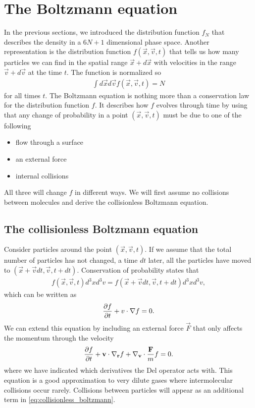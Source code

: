 \section{The Boltzmann equation}
In the previous sections, we introduced the distribution function $f_N$ that describes the density in a $6N+1$ dimensional phase space. Another representation is the distribution function $f(\vec x, \vec v, t)$ that tells us how many particles we can find in the spatial range $\vec x + d\vec x$ with velocities in the range $\vec v + d\vec v$ at the time $t$. The function is normalized so
\begin{align}
	\int d\vec x d\vec v f(\vec x, \vec v, t) = N
\end{align}
for all times $t$. The Boltzmann equation is nothing more than a conservation law for the distribution function $f$. It describes how $f$ evolves through time by using that any change of probability in a point $(\vec x, \vec v, t)$ must be due to one of the following
\begin{itemize}
	\item flow through a surface
	\item an external force
	\item internal collisions
\end{itemize}
All three will change $f$ in different ways. We will first assume no collisions between molecules and derive the collisionless Boltzmann equation. 
\subsection{The collisionless Boltzmann equation}
Consider particles around the point $(\vec x,\vec v, t)$. If we assume that the total number of particles has not changed, a time $dt$ later, all the particles have moved to $(\vec x + \vec vdt, \vec v, t + dt)$. Conservation of probability states that
\begin{align}
	f(\vec x, \vec v, t) d^3xd^3v = f(\vec x + \vec v dt, \vec v, t + dt)d^3xd^3v,
\end{align}
which can be written as
\begin{align}
	\frac{\partial f}{\partial t} + v\cdot\nabla f = 0.
\end{align}
We can extend this equation by including an external force $\vec F$ that only affects the momentum through the velocity
\begin{align}
	\label{eq:collisionless_boltzmann}
	\frac{\partial f}{\partial t} + \mathbf v\cdot\nabla_\mathbf r f + \nabla_\mathbf v \cdot {\mathbf F\over m}f = 0.
\end{align}
where we have indicated which derivatives the Del operator acts with. This equation is a good approximation to very dilute gases where intermolecular collisions occur rarely. Collisions between particles will appear as an additional term in \eqref{eq:collisionless_boltzmann}.
